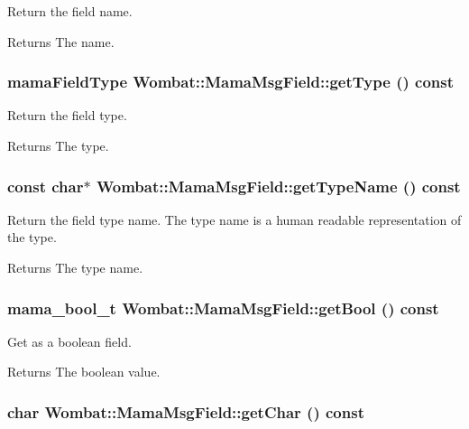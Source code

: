 Return the field name. \begin{DoxyReturn}{Returns}
The name. 
\end{DoxyReturn}
\hypertarget{classWombat_1_1MamaMsgField_a9e6045c695521cb57ba0702ffd062458}{
\subsubsection[{getType}]{\setlength{\rightskip}{0pt plus 5cm}mamaFieldType Wombat::MamaMsgField::getType () const}}
\label{classWombat_1_1MamaMsgField_a9e6045c695521cb57ba0702ffd062458}


Return the field type. \begin{DoxyReturn}{Returns}
The type. 
\end{DoxyReturn}
\hypertarget{classWombat_1_1MamaMsgField_a6d164b861f10d4d03d9f95075155785f}{
\subsubsection[{getTypeName}]{\setlength{\rightskip}{0pt plus 5cm}const char$\ast$ Wombat::MamaMsgField::getTypeName () const}}
\label{classWombat_1_1MamaMsgField_a6d164b861f10d4d03d9f95075155785f}


Return the field type name. The type name is a human readable representation of the type.

\begin{DoxyReturn}{Returns}
The type name. 
\end{DoxyReturn}
\hypertarget{classWombat_1_1MamaMsgField_a54beb8b83848f9481939e96e2f626053}{
\subsubsection[{getBool}]{\setlength{\rightskip}{0pt plus 5cm}mama\_\-bool\_\-t Wombat::MamaMsgField::getBool () const}}
\label{classWombat_1_1MamaMsgField_a54beb8b83848f9481939e96e2f626053}


Get as a boolean field. \begin{DoxyReturn}{Returns}
The boolean value. 
\end{DoxyReturn}
\hypertarget{classWombat_1_1MamaMsgField_a44f2b43319dc08e49a206f02a97af1c3}{
\subsubsection[{getChar}]{\setlength{\rightskip}{0pt plus 5cm}char Wombat::MamaMsgField::getChar () const}}
\label{classWombat_1_1MamaMsgField_a44f2b43319dc08e49a206f02a97af1c3}


